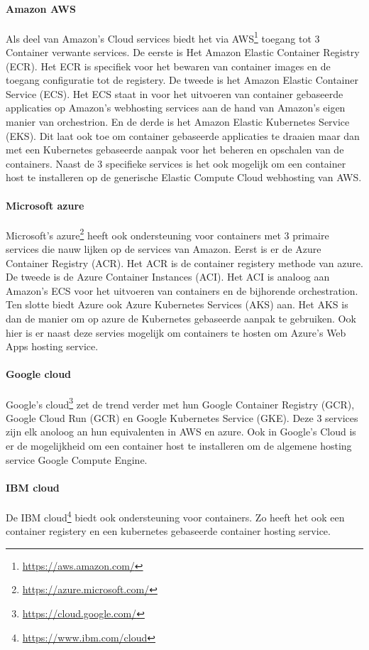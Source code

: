 \paragraph{Amazon AWS}
Als deel van Amazon’s Cloud services biedt het via AWS\footnote{\url{https://aws.amazon.com/}} toegang tot 3 Container verwante services. De eerste is Het Amazon Elastic Container Registry (ECR). Het ECR is specifiek voor het bewaren van container images en de toegang configuratie tot de registery. De tweede is het Amazon Elastic Container Service (ECS). Het ECS staat in voor het uitvoeren van container gebaseerde applicaties op Amazon’s webhosting services aan de hand van Amazon’s eigen manier van orchestrion. En de derde is het Amazon Elastic Kubernetes Service (EKS). Dit laat ook toe om container gebaseerde applicaties te draaien maar dan met een Kubernetes gebaseerde aanpak voor het beheren en opschalen van de containers. Naast de 3 specifieke services is het ook mogelijk om een container host te installeren op de generische Elastic Compute Cloud webhosting van AWS.
\paragraph{Microsoft azure}
Microsoft’s azure\footnote{\url{https://azure.microsoft.com/}} heeft ook ondersteuning voor containers met 3 primaire services die nauw lijken op de services van Amazon. Eerst is er de Azure Container Registry (ACR). Het ACR is de container registery methode van azure. De tweede is de Azure Container Instances (ACI). Het ACI is analoog aan  Amazon’s ECS voor het uitvoeren van containers en de bijhorende orchestration. Ten slotte biedt Azure ook Azure Kubernetes Services (AKS) aan. Het AKS is dan de manier om op azure de Kubernetes gebaseerde aanpak te gebruiken. Ook hier is er naast deze servies mogelijk om containers te hosten om Azure’s Web Apps hosting service.
\paragraph{Google cloud}
Google’s cloud\footnote{\url{https://cloud.google.com/}} zet de trend verder met hun Google Container Registry (GCR), Google Cloud Run (GCR) en Google Kubernetes Service (GKE). Deze 3 services zijn elk anoloog an hun equivalenten in AWS en azure. Ook in Google's Cloud is er de mogelijkheid om een container host te installeren om de algemene hosting service Google Compute Engine.
\paragraph{IBM cloud}
De IBM cloud\footnote{\url{https://www.ibm.com/cloud}} biedt ook ondersteuning voor containers. Zo heeft het ook een container registery en een kubernetes gebaseerde container hosting service.
